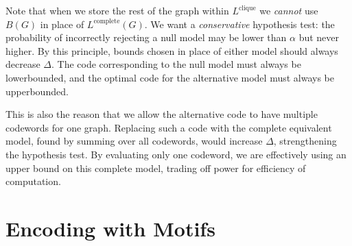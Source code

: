 \documentclass[twoside,11pt]{article}
\begin{document}


Note that when we store the rest of the graph within $L^\text{clique}$ we \emph{cannot} use $B(G)$ in place of $L^\text{complete}(G)$. We want a \emph{conservative} hypothesis test: the probability of incorrectly rejecting a null model may be lower than $\alpha$ but never higher. By this principle, bounds chosen in place of either model should always decrease $\Delta$. The code corresponding to the null model must always be lowerbounded, and the optimal code for the alternative model must always be upperbounded.

This is also the reason that we allow the alternative code to have multiple codewords for one graph. Replacing such a code with the complete equivalent model, found by summing over all codewords, would increase $\Delta$, strengthening the hypothesis test. By evaluating only one codeword, we are effectively using an upper bound on this complete model, trading off power for efficiency of computation.


\section{Encoding with Motifs}
\end{document}
